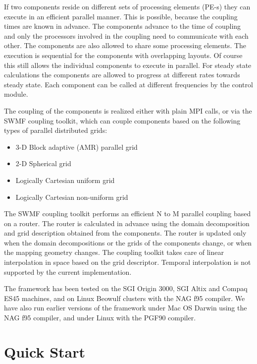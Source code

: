 If two components reside on different sets of processing elements
(PE-s) they can execute in an efficient parallel manner.
This is possible, because the coupling times are
known in advance.  The components advance to the time of coupling and
only the processors involved in the coupling need to communicate with
each other. The components are also allowed to share some processing elements.
The execution is sequential for the components with overlapping layouts.
Of course this still allows the individual components to execute in parallel.
For steady state calculations the components are allowed to progress
at different rates towards steady state. Each component can be called
at different frequencies by the control module.

The coupling of the components is realized either with plain MPI
calls, or via the SWMF coupling toolkit, which can couple components
based on the following types of parallel distributed grids:
\begin{itemize}
\item 3-D Block adaptive (AMR) parallel grid
\item 2-D Spherical grid
\item Logically Cartesian uniform grid
\item Logically Cartesian non-uniform grid 
\end{itemize}
The SWMF coupling toolkit performs an efficient N to M parallel
coupling based on a router. The router is calculated in advance using
the domain decomposition and grid description obtained from the
components.  The router is updated only when the domain decompositions
or the grids of the components change, or when the mapping geometry
changes.  The coupling toolkit takes care of linear interpolation in
space based on the grid descriptor.  Temporal interpolation is not
supported by the current implementation.

The framework has been tested on the SGI Origin 3000, SGI Altix and 
Compaq ES45 machines, and on Linux Beowulf clusters with the NAG f95 
compiler. We have also run earlier versions of the framework under
Mac OS Darwin using the NAG f95 compiler, and under Linux with
the PGF90 compiler.


\chapter{Quick Start}

